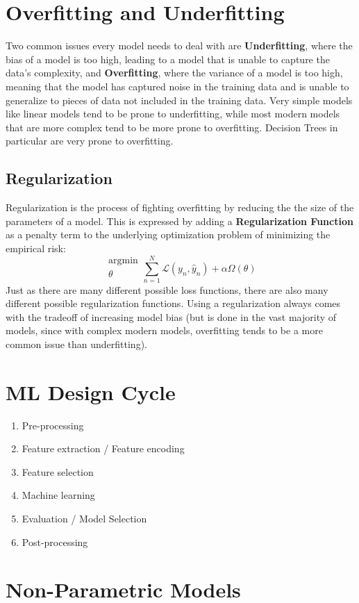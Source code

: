 \documentclass{report}
\newcommand{\tbf}{\textbf}
\newcommand{\argmin}[1] {
    \begin{array}{c}
        \text{argmin}\\
        #1\\
        \end{array}
    }
\begin{document}
\section{Overfitting and Underfitting}
Two common issues every model needs to deal with are \tbf{Underfitting}, where the bias of a model is too high, leading to a model that is unable to capture the data's complexity, and \tbf{Overfitting}, where the variance of a model is too high, meaning that the model has captured noise in the training data and is unable to generalize to pieces of data not included in the training data. Very simple models like linear models tend to be prone to underfitting, while most modern models that are more complex tend to be more prone to overfitting. Decision Trees in particular are very prone to overfitting.
%
\subsection{Regularization}
Regularization is the process of fighting overfitting by reducing the the size of the parameters of a model. This is expressed by adding a \tbf{Regularization Function} as a penalty term to the underlying optimization problem of minimizing the empirical risk:
\begin{equation*}
\argmin{\theta} \sum_{n=1}^N \mathcal{L}(y_n, \hat{y}_n) + \alpha \Omega(\theta)
\end{equation*}
Just as there are many different possible loss functions, there are also many different possible regularization functions. Using a regularization always comes with the tradeoff of increasing model bias (but is done in the vast majority of models, since with complex modern models, overfitting tends to be a more common issue than underfitting).
%
\section{ML Design Cycle}
\begin{enumerate}
 \item Pre-processing
 \item Feature extraction / Feature encoding
 \item Feature selection
 \item Machine learning
 \item Evaluation / Model Selection
 \item Post-processing
\end{enumerate}
%
\section{Non-Parametric Models}
\end{document}
